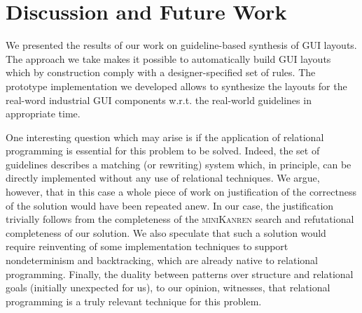 
\section{Discussion and Future Work}

We presented the results of our work on guideline-based synthesis of GUI layouts. The approach we take makes it possible to
automatically build GUI layouts which by construction comply with a designer-specified set of rules. The prototype implementation
we developed allows to synthesize the layouts for the real-word industrial GUI components w.r.t. the real-world guidelines in
appropriate time.

One interesting question which may arise is if the application of relational programming is essential for this problem to be solved. Indeed, the set of guidelines
describes a matching (or rewriting) system which, in principle, can be directly implemented without any use of relational techniques. We argue, however,
that in this case a whole piece of work on justification of the correctness of the solution would have been repeated anew. In our
case, the justification trivially follows from the completeness of the \textsc{miniKanren} search and refutational completeness of our solution. We also speculate
that such a solution would require reinventing of some implementation techniques to support nondeterminism and backtracking, which are already native to relational
programming. Finally, the duality between patterns over structure and relational goals (initially unexpected for us), to our opinion, witnesses, that relational
programming is a truly relevant technique for this problem.



